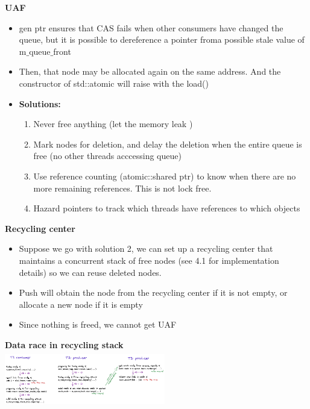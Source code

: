 \documentclass[10pt, landscape]{article}
\begin{document}
\begin{multicols}{4}
\textbf{UAF} \\ 
\begin{itemize}
    \item gen ptr ensures that CAS fails when other consumers have changed the queue, but it is possible to dereference a pointer froma possible stale value of m$\_$queue$\_$front
    \item Then, that node may be allocated again on the same address. And the constructor of std::atomic will raise with the load()
    \item \textbf{Solutions:} 
    \begin{enumerate}
        \item Never free anything (let the memory leak )
        \item Mark nodes for deletion, and delay the deletion when the entire queue is free (no other threads acccessing queue)
        \item Use reference counting (atomic::shared ptr) to know when there are no more remaining references. This is not lock free.
        \item Hazard pointers to track which threads have references to which objects
    \end{enumerate}
\end{itemize}

\textbf{Recycling center} \\
\begin{itemize}
    \item Suppose we go with solution 2, we can set up a recycling center that maintains a concurrent stack of free nodes (see 4.1 for implementation details) so we can reuse deleted nodes.
    \item Push will obtain the node from the recycling center if it is not empty, or allocate a new node if it is empty
    \item Since nothing is freed, we cannot get UAF
\end{itemize}

\textbf{Data race in recycling stack} \\
\includegraphics*[width=7cm,height=2.5cm]{recycling1.png}


\end{multicols}
\end{document}
